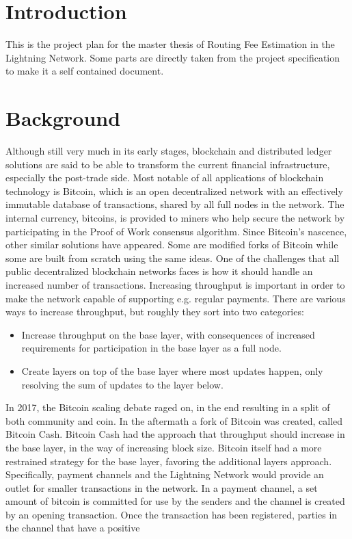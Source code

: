 \documentclass[10pt, titlepage, oneside, a4paper]{article}
\begin{document}
\section{Introduction}

This is the project plan for the master thesis of Routing Fee Estimation in the Lightning Network. Some parts are directly taken from the project specification to make it a self contained document.

\section{Background}

Although still very much in its early stages, blockchain and distributed ledger
solutions are said to be able to transform the current financial infrastructure,
especially the post-trade side. Most notable of all applications of blockchain
technology is Bitcoin, which is an open decentralized network with an effectively
immutable database of transactions, shared by all full nodes in the network. The
internal currency, bitcoins, is provided to miners who help secure the network by
participating in the Proof of Work consensus algorithm. Since Bitcoin’s nascence,
other similar solutions have appeared. Some are modified forks of Bitcoin while
some are built from scratch using the same ideas.
One of the challenges that all public decentralized blockchain networks faces is
how it should handle an increased number of transactions. Increasing throughput
is important in order to make the network capable of supporting e.g. regular
payments. There are various ways to increase throughput, but roughly they sort
into two categories:
\begin{itemize}
	\item Increase throughput on the base layer, with consequences of increased requirements for participation in the base layer as a full node.
	\item  Create layers on top of the base layer where most updates happen, only
	resolving the sum of updates to the layer below.
\end{itemize}

In 2017, the Bitcoin scaling debate raged on, in the end resulting in a split of
both community and coin. In the aftermath a fork of Bitcoin was created, called
Bitcoin Cash. Bitcoin Cash had the approach that throughput should increase in
the base layer, in the way of increasing block size. Bitcoin itself had a more
restrained strategy for the base layer, favoring the additional layers approach.
Specifically, payment channels and the Lightning Network would provide an
outlet for smaller transactions in the network.
In a payment channel, a set amount of bitcoin is committed for use by the
senders and the channel is created by an opening transaction. Once the
transaction has been registered, parties in the channel that have a positive
\end{document}
